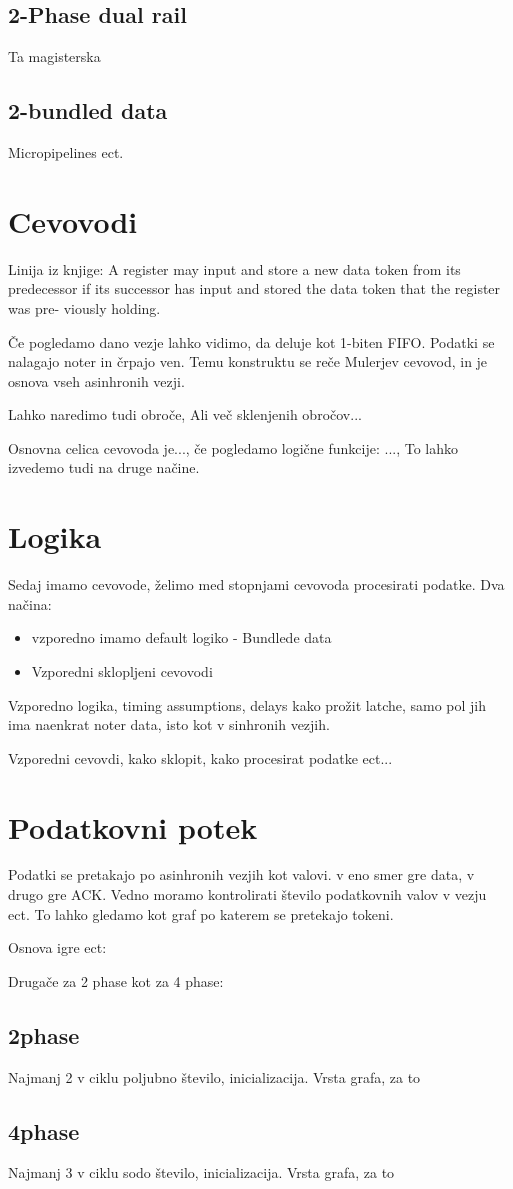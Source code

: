 \subsection{2-Phase dual rail} \label{b}
Ta magisterska

\subsection{2-bundled data} \label{b}
Micropipelines ect.


\section{Cevovodi} \label{a}

Linija iz knjige:
A register may input and store a new data token from its predecessor if
its successor has input and stored the data token that the register was pre-
viously holding.

Če pogledamo dano vezje lahko vidimo, da deluje kot 1-biten FIFO. Podatki se nalagajo noter in črpajo ven. Temu konstruktu se reče Mulerjev cevovod, in je osnova vseh asinhronih vezji.

Lahko naredimo tudi obroče, Ali več sklenjenih obročov...

Osnovna celica cevovoda je..., če pogledamo logične funkcije: ..., To lahko izvedemo tudi na druge načine.


\section{Logika} \label{a}

Sedaj imamo cevovode, želimo med stopnjami cevovoda procesirati podatke. Dva načina:
\begin{itemize}
	\item vzporedno imamo default logiko - Bundlede data
	\item Vzporedni sklopljeni cevovodi
\end{itemize}

Vzporedno logika, timing assumptions, delays kako prožit latche, samo pol jih ima naenkrat noter data, isto kot v sinhronih vezjih.

Vzporedni cevovdi, kako sklopit, kako procesirat podatke ect...






\section{Podatkovni potek} \label{a}
Podatki se pretakajo po asinhronih vezjih kot valovi. v eno smer gre data, v drugo gre ACK. Vedno moramo kontrolirati število podatkovnih valov v vezju ect.
To lahko gledamo kot graf po katerem se pretekajo tokeni. 

Osnova igre ect:

Drugače za 2 phase kot za 4 phase:

\subsection{2phase} \label{b}
Najmanj 2 v ciklu poljubno število, inicializacija. Vrsta grafa, za to

\subsection{4phase} \label{b}
Najmanj 3 v ciklu sodo število, inicializacija. Vrsta grafa, za to

